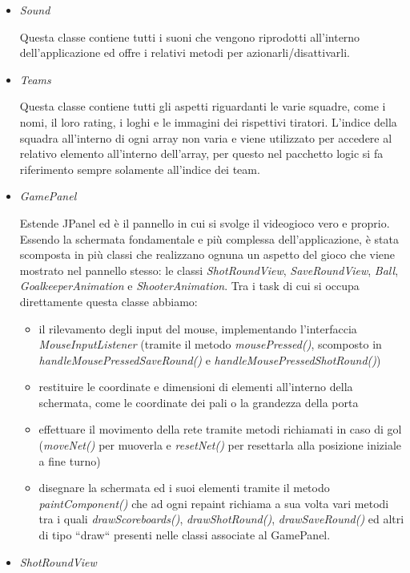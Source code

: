 \documentclass[12pt,a4paper]{report}
\begin{document}
\begin{itemize}
\item\emph{Sound}

Questa classe contiene tutti i suoni che vengono riprodotti all'interno dell'applicazione ed offre i relativi metodi per azionarli/disattivarli.

\item\emph{Teams}

Questa classe contiene tutti gli aspetti riguardanti le varie squadre, come i nomi, il loro rating, i loghi e le immagini dei rispettivi tiratori. L'indice della squadra all'interno di ogni array non varia e viene utilizzato per accedere al relativo elemento all'interno dell'array, per questo nel pacchetto logic si fa riferimento sempre solamente all'indice dei team.

\item\emph{GamePanel}

Estende JPanel ed è il pannello in cui si svolge il videogioco vero e proprio. Essendo la schermata fondamentale e più complessa dell'applicazione, è stata scomposta in più classi che realizzano ognuna un aspetto del gioco che viene mostrato nel pannello stesso: le classi \emph{ShotRoundView}, \emph{SaveRoundView}, \emph{Ball}, \emph{GoalkeeperAnimation} e \emph{ShooterAnimation}.
Tra i task di cui si occupa direttamente questa classe abbiamo:
\begin{itemize}
    \item
    il rilevamento degli input del mouse, implementando l'interfaccia \emph{MouseInputListener} (tramite il metodo \emph{mousePressed()}, scomposto in \emph{handleMousePressedSaveRound()} e \emph{handleMousePressedShotRound()})
    \item
    restituire le coordinate e dimensioni di elementi all'interno della schermata, come le coordinate dei pali o la grandezza della porta
    \item
    effettuare il movimento della rete tramite metodi richiamati in caso di gol (\emph{moveNet()} per muoverla e \emph{resetNet()} per resettarla alla posizione iniziale a fine turno)
    \item
    disegnare la schermata ed i suoi elementi tramite il metodo \emph{paintComponent()} che ad ogni repaint richiama a sua volta vari metodi tra i quali \emph{drawScoreboards()}, \emph{drawShotRound()}, \emph{drawSaveRound()} ed altri di tipo ``draw`` presenti nelle classi associate al GamePanel.
    
\end{itemize}

\item\emph{ShotRoundView}


\end{itemize}
\end{document}
